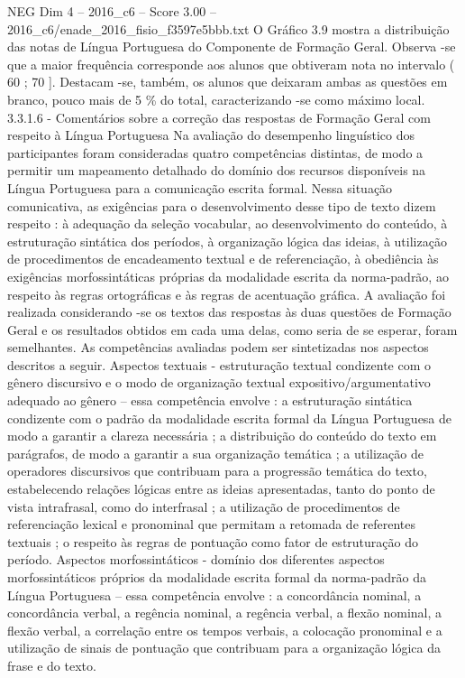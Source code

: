 \begin{textsample}{NEG Dim 4 – 2016\_c6 – Score 3.00 – 2016\_c6/enade\_2016\_fisio\_f3597e5bbb.txt}
O Gráfico 3.9 mostra a distribuição das notas de Língua Portuguesa do Componente de Formação Geral.
Observa -se que a maior frequência corresponde aos alunos que obtiveram nota no intervalo ( 60 ; 70 ].
Destacam -se, também, os alunos que deixaram ambas as questões em branco, pouco mais de 5 \% do total, caracterizando -se como máximo local. 3.3.1.6 - Comentários sobre a correção das respostas de Formação Geral com respeito à Língua Portuguesa Na avaliação do desempenho linguístico dos participantes foram consideradas quatro competências distintas, de modo a permitir um mapeamento detalhado do domínio dos recursos disponíveis na Língua Portuguesa para a comunicação escrita formal.
Nessa situação comunicativa, as exigências para o desenvolvimento desse tipo de texto dizem respeito : à adequação da seleção vocabular, ao desenvolvimento do conteúdo, à estruturação sintática dos períodos, à organização lógica das ideias, à utilização de procedimentos de encadeamento textual e de referenciação, à obediência às exigências morfossintáticas próprias da modalidade escrita da norma-padrão, ao respeito às regras ortográficas e às regras de acentuação gráfica.
A avaliação foi realizada considerando -se os textos das respostas às duas questões de Formação Geral e os resultados obtidos em cada uma delas, como seria de se esperar, foram semelhantes.
As competências avaliadas podem ser sintetizadas nos aspectos descritos a seguir.
Aspectos textuais - estruturação textual condizente com o gênero discursivo e o modo de organização textual expositivo/argumentativo adequado ao gênero – essa competência envolve : a estruturação sintática condizente com o padrão da modalidade escrita formal da Língua Portuguesa de modo a garantir a clareza necessária ; a distribuição do conteúdo do texto em parágrafos, de modo a garantir a sua organização temática ; a utilização de operadores discursivos que contribuam para a progressão temática do texto, estabelecendo relações lógicas entre as ideias apresentadas, tanto do ponto de vista intrafrasal, como do interfrasal ; a utilização de procedimentos de referenciação lexical e pronominal que permitam a retomada de referentes textuais ; o respeito às regras de pontuação como fator de estruturação do período.
Aspectos morfossintáticos - domínio dos diferentes aspectos morfossintáticos próprios da modalidade escrita formal da norma-padrão da Língua Portuguesa – essa competência envolve : a concordância nominal, a concordância verbal, a regência nominal, a regência verbal, a flexão nominal, a flexão verbal, a correlação entre os tempos verbais, a colocação pronominal e a utilização de sinais de pontuação que contribuam para a organização lógica da frase e do texto.

\end{textsample}
